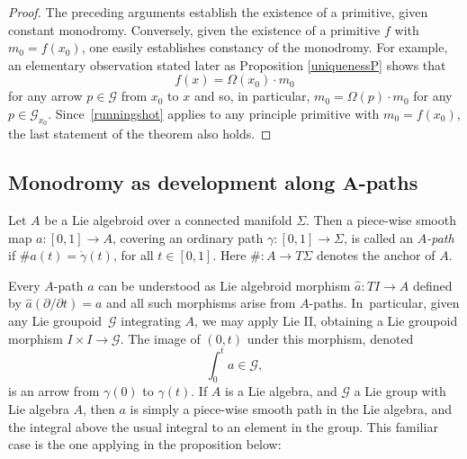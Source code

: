 \documentclass[pdftex]{sigma}%
\numberwithin{equation}{section}
\newcommand\integral{\int}
\begin{document}
\begin{proof}The preceding arguments establish the existence of a
primitive, given constant monodromy. Conversely, given the existence
of a primitive $f$ with $m_0=f(x_0)$, one easily establishes constancy
of the monodromy. For example, an elementary observation stated later
as Proposition \ref{uniquenessP} shows that
 \begin{equation}
 f(x) = \Omega (x_0)\cdot m_0\label{runningshot}
 \end{equation}
 for any arrow $p \in {\mathcal G} $ from $x_0$ to $x$ and so, in particular, $m_0=\Omega (p)\cdot m_0$ for any $p \in
{\mathcal G}_{x_0}$. Since~\eqref{runningshot} applies to any
principle primitive with $m_0=f(x_0)$, the last statement of the
theorem also holds.
\end{proof}

\subsection*{Monodromy as development along $\boldsymbol{A}$-paths}

Let $A$ be a Lie algebroid over a connected manifold $\Sigma $. Then a
piece-wise smooth map $a \colon [0,1] \allowbreak\rightarrow A$, covering an
ordinary path $\gamma \colon [0,1] \rightarrow \Sigma $, is called an
{\it $A$-path} if $\# a(t) = \dot \gamma(t)$, for all $t \in
[0,1]$. Here $\# \colon A \rightarrow T \Sigma $ denotes the anchor of
$A$.

Every $A$-path $a$ can be understood as Lie algebroid morphism $\hat a
\colon {T}I \rightarrow A$ defined by $\hat a (\partial/\partial t)=a$
and all such morphisms arise from $A$-paths. In~particular, given any
Lie groupoid~${\mathcal G} $ integrating $A$, we may apply Lie II,
obtaining a Lie groupoid morphism $I \times I \rightarrow {\mathcal G}
$. The image of $(0, t)$ under this morphism, denoted
\begin{equation*}
\integral_0^t a \in {\mathcal G},
\end{equation*} is an arrow from $\gamma(0)$ to $\gamma(t)$. If $A$ is
a Lie algebra, and ${\mathcal G} $ a Lie group with Lie algebra $A$, then
$a$ is simply a piece-wise smooth path in the Lie algebra, and the
integral above the usual integral to an element in the group. This
familiar case is the one applying in the proposition below:
\end{document}

